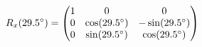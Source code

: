 \documentclass[preview]{standalone}
\begin{document}
\begin{align*}
\special{dvisvgm:raw <g id='unique000'>}R_x(29.5^\circ) = \begin{pmatrix} 1 & 0 & 0 \\ 0 & \cos(29.5^\circ) & -\sin(29.5^\circ) \\ 0 & \sin(29.5^\circ) & \cos(29.5^\circ) \end{pmatrix}\special{dvisvgm:raw </g>}
\end{align*}
\end{document}
